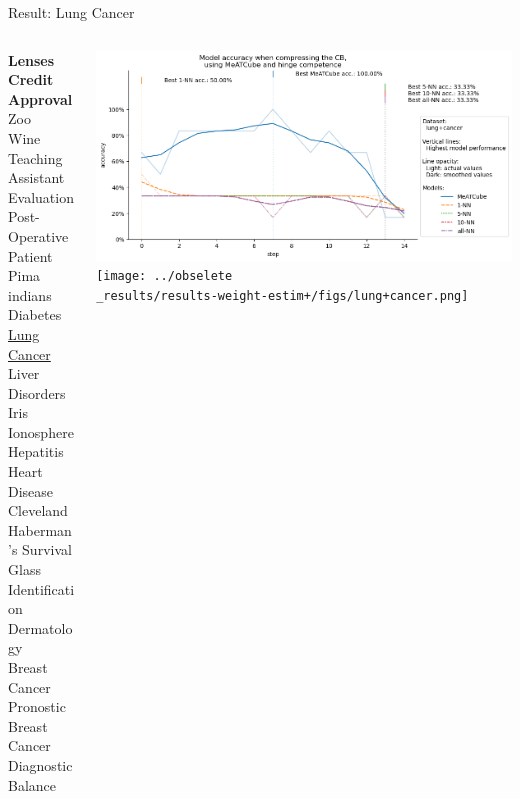 \documentclass[]{beamer}
\begin{document}
\begin{frame}{Result: Lung Cancer}
    \begin{columns}
        \begin{column}{.3\textwidth}
            {\smaller\smaller\smaller
            \textbf{Lenses} \\
            \textbf{Credit Approval} \\
            Zoo \\
            Wine \\
            Teaching Assistant Evaluation \\
            Post-Operative Patient \\
            Pima indians Diabetes \\
            \underline{Lung Cancer} \\
            Liver Disorders \\
            Iris \\
            Ionosphere \\
            Hepatitis \\
            Heart Disease Cleveland \\
            Haberman's Survival \\
            Glass Identification \\
            Dermatology \\
            Breast Cancer Pronostic \\
            Breast Cancer Diagnostic \\
            Balance\\
            ~}
        \end{column}
        \begin{column}{.7\textwidth}
            \includegraphics[width=\textwidth]{../results-no-sim-tuning+/figs/lung+cancer.png}
            \texttt{[image: ../obselete\\\_results/results-weight-estim+/figs/lung+cancer.png]}
        \end{column}
    \end{columns}
\end{frame}
\end{document}

